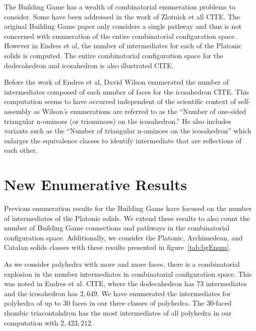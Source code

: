 The Building Game has a wealth of combinatorial enumeration problems to consider. Some have been addressed in the work of Zlotnick et all CITE. The original Building Game paper only considers a single pathway and thus is not concerned with enumeration of the entire combinatorial configuration space. However in Endres et al, the number of intermediates for each of the Platonic solids is computed. The entire combinatorial configuration space for the dodecahedron and icosahedron is also illustrated CITE. 

Before the work of Endres et al, David Wilson enumerated the number of intermediates composed of each number of faces for the icosahedron CITE. This computation seems to have occurred independent of the scientific context of self-assembly as Wilson's enumerations are referred to as the ``Number of one-sided triangular n-ominoes (or triominoes) on the icosahedron.'' He also includes variants such as the ``Number of triangular n-ominoes on the icosahedron'' which enlarges the equivalence classes to identify intermediate that are reflections of each other. 

\section{New Enumerative Results}

Previous enumeration results for the Building Game have focused on the number of intermediates of the Platonic solids. We extend these results to also count the number of Building Game connections and pathways in the combinatorial configuration space. Additionally, we consider the Platonic, Archimedean, and Catalan solids classes with these results presented in figure~\ref{tab:bgEnum}. 

As we consider polyhedra with more and more faces, there is a combinatorial explosion in the number intermediates in combinatorial configuration space. This was noted in Endres et al. CITE, where the dodecahedron has $73$ intermediates and the icosahedron has $2,649$. We have enumerated the intermediates for polyhedra of up to $30$ faces in our three classes of polyhedra. The $30$-faced rhombic triacontahdron has the most intermediates of all polyhedra in our computation with $2,423,212$.






